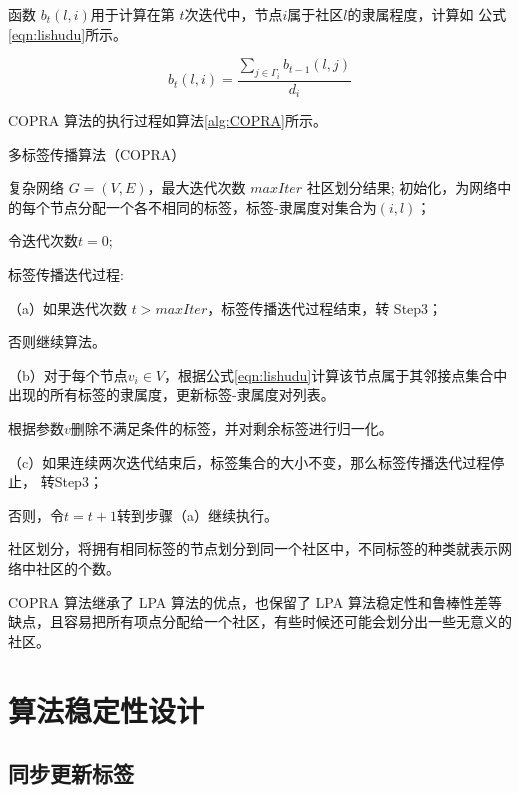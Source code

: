 函数 $b_t(l, i)$用于计算在第 $t $次迭代中，节点$ i $属于社区$ l $的隶属程度，计算如
公式\ref{eqn:lishudu}所示。

\begin{equation}
  \label{eqn:lishudu}
  b_t(l,i)=\frac{\sum_{j\in \Gamma_i }b_{t-1}(l,j)}{d_i}
\end{equation}

COPRA 算法的执行过程如算法\ref{alg:COPRA}所示。

\begin{algorithm}[htb]  
  \caption{多标签传播算法（COPRA）}  
  \label{alg:COPRA}  
  \begin{algorithmic}[1]  
    \Require  
    复杂网络 $G = (V, E)$，最大迭代次数 $maxIter$   
    \Ensure  
      社区划分结果;  
    \State 初始化，为网络中的每个节点分配一个各不相同的标签，标签-隶属度对集合为${(i,l)}$；
    
          令迭代次数$t=0$;  

    \State 标签传播迭代过程:

    （a）如果迭代次数 $t > maxIter$，标签传播迭代过程结束，转 Step3；
    
    否则继续算法。 

    （b）对于每个节点$v_i\in V$，根据公式\ref{eqn:lishudu}计算该节点属于其邻接点集合中出现的所有标签的隶属度，更新标签-隶属度对列表。
    
    根据参数$v$删除不满足条件的标签，并对剩余标签进行归一化。 
     
    （c）如果连续两次迭代结束后，标签集合的大小不变，那么标签传播迭代过程停止，
    转Step3；
    
    否则，令$t = t+1$转到步骤（a）继续执行。

    \State 社区划分，将拥有相同标签的节点划分到同一个社区中，不同标签的种类就表示网络中社区的个数。
  \end{algorithmic}  
\end{algorithm} 

COPRA 算法继承了 LPA 算法的优点，也保留了 LPA 算法稳定性和鲁棒性差等缺点，且容易把所有项点分配给一个社区，有些时候还可能会划分出一些无意义的社区。

\section{算法稳定性设计}

\subsection{同步更新标签}

